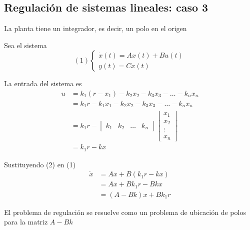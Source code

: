 \subsection{Regulación de sistemas lineales: caso 3}

La planta tiene un integrador, es decir, un polo en el origen

Sea el sistema 
\[
    (1)
    \left\{
        \begin{array}{lll}
            \dot{x}(t) = Ax(t) + Bu(t)\\
            y(t) = Cx(t)
        \end{array}
    \right.
\]

La entrada del sistema es
\[
    \begin{split}
        u & = k_{1}(r - x_{1}) - k_{2}x_{2} - k_{3}x_{3} - \ldots - k_{n}x_{n} \\
        & = k_{1}r - k_{1}x_{1} - k_{2}x_{2} - k_{3}x_{3} - \ldots - k_{n}x_{n} \\
        & = k_{1}r - 
        \begin{bmatrix}
            k_{1} & k_{2} & \ldots & k_{n}
        \end{bmatrix}
        \begin{bmatrix}
            x_{1} \\ x_{2} \\ \vdots \\ x_{n}
        \end{bmatrix} \\
        & = k_{1}r - kx
    \end{split}
\]

Sustituyendo (2) en (1)
\[
    \begin{split}
        \dot{x} & = Ax + B(k_{1}r - kx) \\
        & = Ax + Bk_{1}r - Bkx \\
        & = (A-Bk)x + Bk_{1}r
    \end{split}
\]

El problema de regulación se resuelve como un problema de ubicación de polos para la matriz \( A-Bk \)
